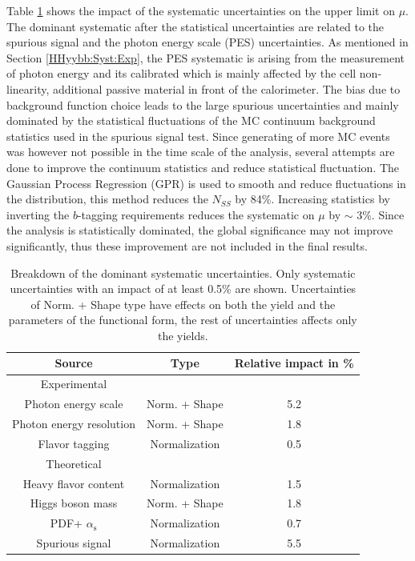 Table \ref{tab:HHyybb:Results:Xsec:Sys} shows the impact of the systematic uncertainties on the upper limit on $\mu$. The dominant systematic after the statistical uncertainties are related to the spurious signal and the photon energy scale (PES) uncertainties. As mentioned in Section \ref{HHyybb:Syst:Exp}, the PES systematic is arising from the measurement of photon energy and its calibrated which is mainly affected by the cell non-linearity, additional passive material in front of the calorimeter. The bias due to background function choice leads to the large spurious uncertainties and mainly dominated by the statistical fluctuations of the MC continuum background statistics used in the spurious signal test. Since generating of more MC events was however not possible in the time scale of the analysis, several attempts are done to improve the continuum statistics and reduce statistical fluctuation. The Gaussian Process Regression (GPR) \cite{GPR} is used to smooth and reduce fluctuations in the \myy distribution, this method reduces the $N_{SS}$ by 84\%. Increasing statistics by inverting the $b$-tagging requirements reduces the systematic on $\mu$ by $\sim$ 3\%. Since the analysis is statistically dominated, the global significance may not improve significantly, thus these improvement are not included in the final results.  
\begin{table}[htbp]
    \centering
    \begin{tabular}{ccc}
\hline \hline 
Source & Type & Relative impact in \%  \\
\hline Experimental & & \\
\hline Photon energy scale & Norm. + Shape & 5.2  \\
Photon energy resolution & Norm. + Shape & 1.8  \\
Flavor tagging & Normalization & 0.5  \\
\hline Theoretical & & \\
\hline Heavy flavor content & Normalization & 1.5  \\
Higgs boson mass & Norm. + Shape & 1.8  \\
PDF+ $\alpha_{\mathrm{s}}$ & Normalization & 0.7  \\
\hline Spurious signal & Normalization & 5.5 \\
\hline \hline
\end{tabular}
    \caption{Breakdown of the dominant systematic uncertainties. Only systematic uncertainties with an impact of at least 0.5\% are shown. Uncertainties of Norm. + Shape type have effects on both the yield and the parameters of the functional form, the rest of uncertainties affects only the yields.}
    \label{tab:HHyybb:Results:Xsec:Sys}
\end{table}

